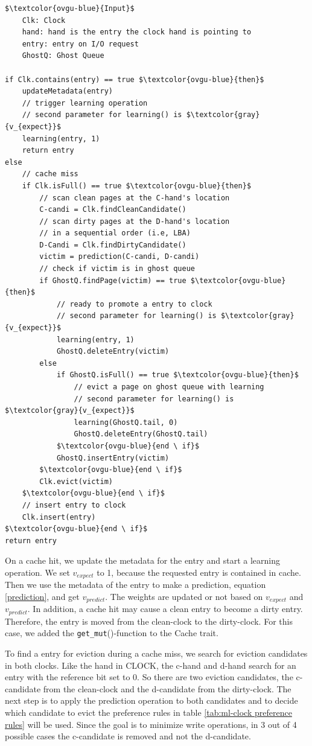 \documentclass[
	12pt,
	a4paper,
	abstract,
	bibliography=totoc,
	chapterprefix,
	headings=openright,
	numbers=endperiod,
	parskip=half,
	twoside,
]{scrreprt}
\begin{document}
\begin{lstlisting}[mathescape=true,caption={ML-CLOCK replacement algorithm in pseudocode, slightly modified from \cite{jiang2005clock}},label=lst:ml-clock-algorithm]
$\textcolor{ovgu-blue}{Input}$
	Clk: Clock
	hand: hand is the entry the clock hand is pointing to
	entry: entry on I/O request
	GhostQ: Ghost Queue

if Clk.contains(entry) == true $\textcolor{ovgu-blue}{then}$
	updateMetadata(entry)
	// trigger learning operation
	// second parameter for learning() is $\textcolor{gray}{v_{expect}}$
	learning(entry, 1)
	return entry
else
	// cache miss
	if Clk.isFull() == true $\textcolor{ovgu-blue}{then}$
		// scan clean pages at the C-hand's location
		C-candi = Clk.findCleanCandidate()
		// scan dirty pages at the D-hand's location
		// in a sequential order (i.e, LBA)
		D-Candi = Clk.findDirtyCandidate()
		victim = prediction(C-candi, D-candi)
		// check if victim is in ghost queue
		if GhostQ.findPage(victim) == true $\textcolor{ovgu-blue}{then}$
			// ready to promote a entry to clock
			// second parameter for learning() is $\textcolor{gray}{v_{expect}}$
			learning(entry, 1)
			GhostQ.deleteEntry(victim)
		else
			if GhostQ.isFull() == true $\textcolor{ovgu-blue}{then}$
				// evict a page on ghost queue with learning
				// second parameter for learning() is $\textcolor{gray}{v_{expect}}$
				learning(GhostQ.tail, 0)
				GhostQ.deleteEntry(GhostQ.tail)
			$\textcolor{ovgu-blue}{end \ if}$
			GhostQ.insertEntry(victim)
		$\textcolor{ovgu-blue}{end \ if}$
		Clk.evict(victim)
	$\textcolor{ovgu-blue}{end \ if}$
	// insert entry to clock
	Clk.insert(entry)
$\textcolor{ovgu-blue}{end \ if}$
return entry 
\end{lstlisting}

On a cache hit, we update the metadata for the entry and start a learning operation.
We set $v_{expect}$ to 1, because the requested entry is contained in cache.
Then we use the metadata of the entry to make a prediction, equation \ref{prediction}, and get $v_{predict}$.
The weights are updated or not based on $v_{expect}$ and $v_{predict}$.
In addition, a cache hit may cause a clean entry to become a dirty entry.
Therefore, the entry is moved from the clean-clock to the dirty-clock.
For this case, we added the \texttt{get\_mut}()-function to the Cache trait.

To find a entry for eviction during a cache miss, 
we search for eviction candidates in both clocks.
Like the hand in CLOCK, the c-hand and d-hand search for an entry with the reference bit set to 0.
So there are two eviction candidates, the c-candidate from the clean-clock and the d-candidate from the dirty-clock.
The next step is to apply the prediction operation to both candidates and to decide which candidate to evict the preference 
rules in table \ref{tab:ml-clock preference rules} will be used.
Since the goal is to minimize write operations, in 3 out of 4 possible cases the c-candidate is removed and not the d-candidate.
\end{document}
